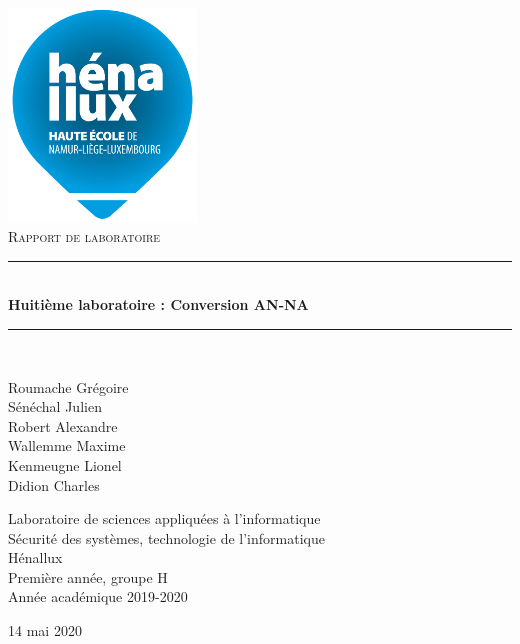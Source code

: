 \documentclass[a4paper]{article}
\newcommand{\HRule}{\rule{\linewidth}{0.5mm}}
\begin{document}
\begin{titlepage}
    \begin{sffamily}
        \begin{center}
            \includegraphics[width=5cm]{images/LogoHenallux.PNG}~\\[1.5cm]
            \textsc{\Large Rapport de laboratoire}\\[1.5cm]

            \HRule \\[0.4cm]
            { \huge \bfseries Huitième laboratoire : Conversion AN-NA\\[0.4cm] }
            \HRule \\[2cm]

            \begin{minipage}{0.4\textwidth}
                \begin{flushleft} \large
                    Roumache Grégoire\\
                    Sénéchal Julien\\
                    Robert Alexandre\\
                    Wallemme Maxime\\
                    Kenmeugne Lionel\\
                    Didion Charles
                \end{flushleft}
            \end{minipage}
            \begin{minipage}{0.55\textwidth}
                \begin{flushright} \large
                    Laboratoire de sciences appliquées à l'informatique\\
                    Sécurité des systèmes, technologie de l'informatique\\
                    Hénallux\\
                    Première année, groupe H \\
                    Année académique 2019-2020\\
                \end{flushright}
            \end{minipage}
            \vfill

            {\large 14 mai 2020}
        \end{center}
    \end{sffamily}
\end{titlepage}
\end{document}
